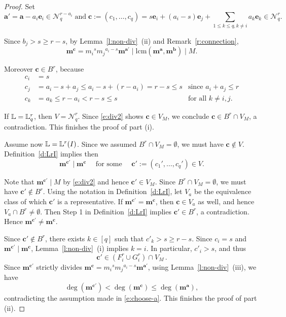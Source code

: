 \documentclass[11pt]{article}
\theoremstyle{definition}
\numberwithin{equation}{section}
\newcommand{\N}{\mathcal{N}}
\newcommand{\Nrq}{\mathcal{N}^r_q}
\newcommand{\m}{\mathbf{m}}
\newcommand{\lcm}{\mathrm{lcm}}
\newcommand{\Lrq}{\mathbb{L}^r_q}
\newcommand{\Lr}{\mathbb{L}^r}
\newcommand{\ba}{\mathbf{a}}
\newcommand{\bb}{\mathbf{b}}
\newcommand{\bc}{\mathbf{c}}
\newcommand{\be}{\mathbf{e}}
\newcommand{\bma}{\mathbf{m}^\ba}
\newcommand{\bmb}{\mathbf{m}^\bb}
\newcommand{\qforsome}{\quad \mbox{ for some } \quad }
\begin{document}
\begin{proof}
 Set $$\ba'=\ba-a_i\be_i\in \N^{r-a_i}_q \; \textrm{and} \; \bc := (c_1, \ldots, c_q) =s \be_i + (a_i-s) \be_j + \sum_{1\le k\le
   q, k\ne i} a_k\be _k\in \Nrq.$$
 
 Since $b_j > s \geq r-s$, by Lemma~\ref{l:non-div}~\textup{(}ii\textup{)}
 and Remark~\ref{r:connection},
 \begin{equation}
 \label{e:div2}
 \m^{\bc} ={m_i}^{s}{m_j}^{a_i-s}\m^{\ba'} \mid \lcm(\bma, \bmb) \mid M.
 \end{equation}
 
  Moreover $\bc\in B^r$, because
\begin{align*}
c_i&=s &\\
c_j&= a_i-s+a_j\le a_i-s+(r-a_i)=r-s \le s &\mbox{since } a_i+a_j \leq r\\
c_k&=a_k\leq r - a_i<r-s\le s &\mbox{for all } k \neq i,j.
\end{align*}
 
If $\Ll=\Lrq$, then $V=\Nrq$. Since \eqref{e:div2} shows $\bc\in V_M$, we conclude $\bc\in B^r\cap V_{M}$, a contradiction. This finishes the proof  of part (i). 

Assume now $\Ll=\Lr(I)$. Since we assumed $B^r\cap V_{M}=\emptyset$, we must have  $\bc \notin V$. Definition~\ref{d:LrI} implies then $$\m^{\bc'} \mid \m^{\bc}
\qforsome \bc':=(c_1', \ldots, c_q') \in V.$$

Note that $\m^{\bc'}\mid M$ by \eqref{e:div2} and hence $\bc'\in
V_M$. Since $B^r\cap V_{M}=\emptyset$, we must have $\bc'\notin
B^r$. Using the notation in Definition~\ref{d:LrI}, let $V_a$ be the equivalence
class of which $\bc'$ is a representative. If $\m^{\bc'}=\m^{\bc}$,
then $\bc\in V_a$ as well, and hence $V_a\cap B^r\neq\emptyset$. Then
Step 1 in Definition~\ref{d:LrI} implies $\bc'\in B^r$, a contradiction. Hence
$\m^{\bc'}\ne \m^{\bc}$.
 
 Since  $\bc'\notin B^r$, there exists $k\in [q]$ such that
 $c'_k>s\ge r-s$. Since $c_i=s$ and $\m^{\bc'}\mid \m^{\bc}$, 
 Lemma~\ref{l:non-div}~\textup{(}i\textup{)} implies $k=i$.  In particular,
 $c'_i>s$, and thus  
 $$
   \bc'\in (F^r_i\cup G^r_i)\cap V_M\,. 
 $$
Since $\m^{\bc'}$ strictly divides
$\m^{\bc}={m_i}^{s}{m_j}^{a_i-s}\m^{\ba'}$, using Lemma~\ref{l:non-div}~\textup{(}iii\textup{)}, we have 
 $$\deg(\m^{\bc'})<\deg(\m^\bc) \leq
\deg(\bma),$$ contradicting the assumption made in
\eqref{e:choose-a}. This finishes the proof of part (ii). 
\end{proof}
\end{document}
